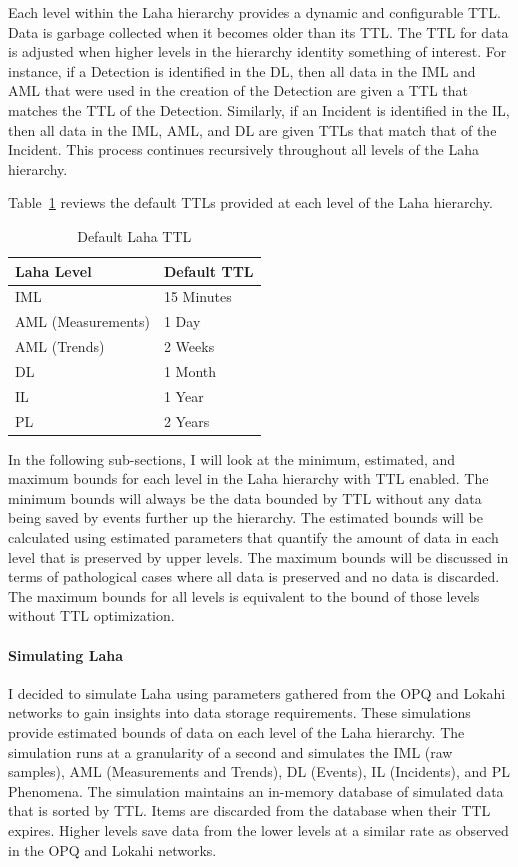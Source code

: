 Each level within the Laha hierarchy provides a dynamic and configurable TTL. Data is garbage collected when it becomes older than its TTL. The TTL for data is adjusted when higher levels in the hierarchy identity something of interest. For instance, if a Detection is identified in the DL, then all data in the IML and AML that were used in the creation of the Detection are given a TTL that matches the TTL of the Detection. Similarly, if an Incident is identified in the IL, then all data in the IML, AML, and DL are given TTLs that match that of the Incident. This process continues recursively throughout all levels of the Laha hierarchy.

Table~\ref{table:ttl_summary} reviews the default TTLs provided at each level of the Laha hierarchy.

\begin{table}[H]
	\centering
	\caption{Default Laha TTL}
	\begin{tabularx}{\textwidth}{ll}
		\toprule
		\textbf{Laha Level} & \textbf{Default TTL} \\
		\midrule
		IML & 15 Minutes \\
		AML (Measurements) & 1 Day \\
		AML (Trends) & 2 Weeks \\
		DL & 1 Month \\
		IL & 1 Year \\
		PL & 2 Years \\
		\bottomrule
	\end{tabularx}
	\label{table:ttl_summary}
\end{table}

In the following sub-sections, I will look at the minimum, estimated, and maximum bounds for each level in the Laha hierarchy with TTL enabled. The minimum bounds will always be the data bounded by TTL without any data being saved by events further up the hierarchy. The estimated bounds will be calculated using estimated parameters that quantify the amount of data in each level that is preserved by upper levels. The maximum bounds will be discussed in terms of pathological cases where all data is preserved and no data is discarded. The maximum bounds for all levels is equivalent to the bound of those levels without TTL optimization.

\paragraph{Simulating Laha}

I decided to simulate Laha using parameters gathered from the OPQ and Lokahi networks to gain insights into data storage requirements. These simulations provide estimated bounds of data on each level of the Laha hierarchy. The simulation runs at a granularity of a second and simulates the IML (raw samples), AML (Measurements and Trends), DL (Events), IL (Incidents), and PL Phenomena. The simulation maintains an in-memory database of simulated data that is sorted by TTL. Items are discarded from the database when their TTL expires. Higher levels save data from the lower levels at a similar rate as observed in the OPQ and Lokahi networks.

